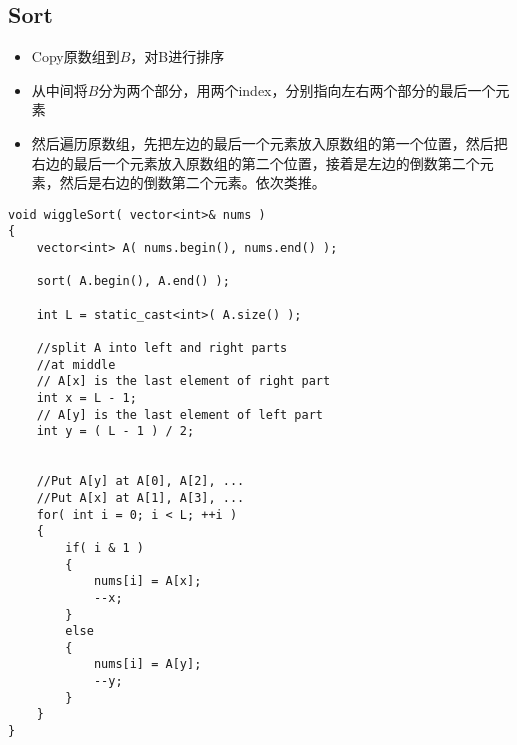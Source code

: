 \subsection{Sort}
\begin{itemize}
\item Copy原数组到$B$，对B进行排序
\item 从中间将$B$分为两个部分，用两个index，分别指向左右两个部分的最后一个元素
\item 然后遍历原数组，先把左边的最后一个元素放入原数组的第一个位置，然后把右边的最后一个元素放入原数组的第二个位置，接着是左边的倒数第二个元素，然后是右边的倒数第二个元素。依次类推。
\end{itemize}
\setcounter{lstlisting}{0}
\begin{lstlisting}[style=customc, caption={Sort}]
void wiggleSort( vector<int>& nums )
{
    vector<int> A( nums.begin(), nums.end() );

    sort( A.begin(), A.end() );

    int L = static_cast<int>( A.size() );

    //split A into left and right parts
    //at middle
    // A[x] is the last element of right part
    int x = L - 1;
    // A[y] is the last element of left part
    int y = ( L - 1 ) / 2;


    //Put A[y] at A[0], A[2], ...
    //Put A[x] at A[1], A[3], ...
    for( int i = 0; i < L; ++i )
    {
        if( i & 1 )
        {
            nums[i] = A[x];
            --x;
        }
        else
        {
            nums[i] = A[y];
            --y;
        }
    }
}
\end{lstlisting}

